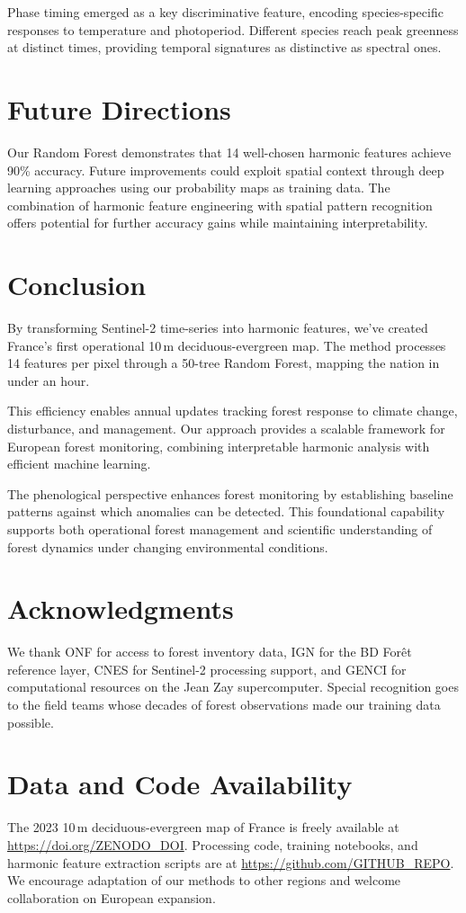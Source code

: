 \documentclass[utf8]{FrontiersinHarvard}
\begin{document}
Phase timing emerged as a key discriminative feature, encoding species-specific responses to temperature and photoperiod. Different species reach peak greenness at distinct times, providing temporal signatures as distinctive as spectral ones.

\section{Future Directions}

Our Random Forest demonstrates that 14 well-chosen harmonic features achieve 90\% accuracy. Future improvements could exploit spatial context through deep learning approaches using our probability maps as training data. The combination of harmonic feature engineering with spatial pattern recognition offers potential for further accuracy gains while maintaining interpretability.

\section{Conclusion}

By transforming Sentinel-2 time-series into harmonic features, we've created France's first operational 10\,m deciduous-evergreen map. The method processes 14 features per pixel through a 50-tree Random Forest, mapping the nation in under an hour.

This efficiency enables annual updates tracking forest response to climate change, disturbance, and management. Our approach provides a scalable framework for European forest monitoring, combining interpretable harmonic analysis with efficient machine learning.

The phenological perspective enhances forest monitoring by establishing baseline patterns against which anomalies can be detected. This foundational capability supports both operational forest management and scientific understanding of forest dynamics under changing environmental conditions.

\section*{Acknowledgments}
We thank ONF for access to forest inventory data, IGN for the BD Forêt reference layer, CNES for Sentinel-2 processing support, and GENCI for computational resources on the Jean Zay supercomputer. Special recognition goes to the field teams whose decades of forest observations made our training data possible.

\section*{Data and Code Availability}
The 2023 10\,m deciduous-evergreen map of France is freely available at \url{https://doi.org/ZENODO_DOI}. 
Processing code, training notebooks, and harmonic feature extraction scripts are at \url{https://github.com/GITHUB_REPO}.
We encourage adaptation of our methods to other regions and welcome collaboration on European expansion.



\end{document}
